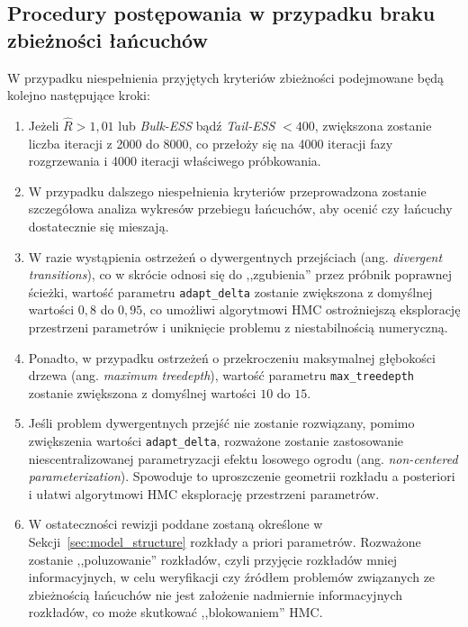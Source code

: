 \documentclass[12pt, a4paper]{article}
\begin{document}
\subsection{Procedury postępowania w przypadku braku zbieżności łańcuchów}\label{subsec:convergence}
W przypadku niespełnienia przyjętych kryteriów zbieżności podejmowane będą kolejno następujące kroki:
\begin{enumerate}
    \item Jeżeli $\hat{R} > 1{,}01$ lub \textit{Bulk-ESS} bądź \textit{Tail-ESS} $< 400$, zwiększona zostanie liczba iteracji z 2000 do 8000, co przełoży się na 4000 iteracji fazy rozgrzewania i 4000 iteracji właściwego próbkowania.
    
    \item W przypadku dalszego niespełnienia kryteriów przeprowadzona zostanie szczegółowa analiza wykresów przebiegu łańcuchów, aby ocenić czy łańcuchy dostatecznie się mieszają.
    
    \item W razie wystąpienia ostrzeżeń o dywergentnych przejściach (ang. \textit{divergent transitions}), co w skrócie odnosi się do ,,zgubienia'' przez próbnik poprawnej ścieżki, wartość parametru \texttt{adapt\_delta} zostanie zwiększona z domyślnej wartości $0{,}8$ do $0{,}95$, co umożliwi algorytmowi HMC ostrożniejszą eksplorację przestrzeni parametrów i uniknięcie problemu z niestabilnością numeryczną.
    \item Ponadto, w przypadku ostrzeżeń o przekroczeniu maksymalnej głębokości drzewa (ang. \textit{maximum treedepth}), wartość parametru \texttt{max\_treedepth} zostanie zwiększona z domyślnej wartości $10$ do $15$.
    \item Jeśli problem dywergentnych przejść nie zostanie rozwiązany, pomimo zwiększenia wartości \texttt{adapt\_delta}, rozważone zostanie zastosowanie niescentralizowanej parametryzacji efektu losowego ogrodu (ang. \textit{non-centered parameterization}). Spowoduje to uproszczenie geometrii rozkładu a posteriori i ułatwi algorytmowi HMC eksplorację przestrzeni parametrów.


    \item W ostateczności rewizji poddane zostaną określone w Sekcji~\ref{sec:model_structure} rozkłady a priori parametrów. Rozważone zostanie ,,poluzowanie'' rozkładów, czyli przyjęcie rozkładów mniej informacyjnych, w celu weryfikacji czy źródłem problemów związanych ze zbieżnością łańcuchów nie jest założenie nadmiernie informacyjnych rozkładów, co może skutkować ,,blokowaniem'' HMC. 
\end{enumerate}
\end{document}
